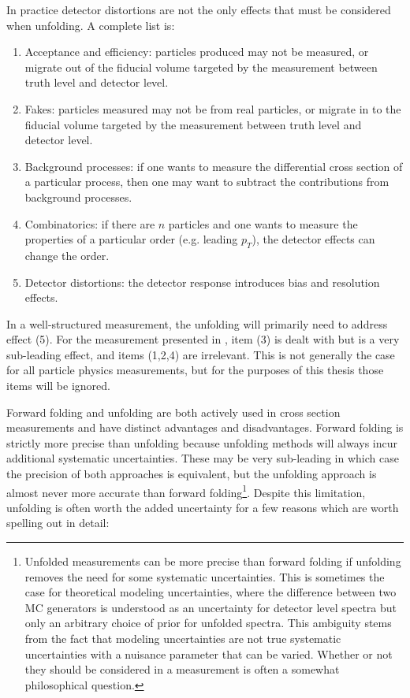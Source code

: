 In practice detector distortions are not the only effects that must be considered when unfolding.
A complete list is:
\begin{enumerate}[label={(\arabic*)}]
    \item Acceptance and efficiency: particles produced may not be measured, or migrate out of the fiducial volume targeted by the measurement between truth level and detector level.
    \item Fakes: particles measured may not be from real particles, or migrate in to the fiducial volume targeted by the measurement between truth level and detector level.
    \item Background processes: if one wants to measure the differential cross section of a particular process, then one may want to subtract the contributions from background processes.
    \item Combinatorics: if there are $n$ particles and one wants to measure the properties of a particular order (e.g. leading $p_T$), the detector effects can change the order.
    \item Detector distortions: the detector response introduces bias and resolution effects.
\end{enumerate}
In a well-structured measurement, the unfolding will primarily need to address effect (5).
For the measurement presented in , item (3) is dealt with but is a very sub-leading effect, and items (1,2,4) are irrelevant.
This is not generally the case for all particle physics measurements, but for the purposes of this thesis those items will be ignored.

Forward folding and unfolding are both actively used in cross section measurements and have distinct advantages and disadvantages.
Forward folding is strictly more precise than unfolding because unfolding methods will always incur additional systematic uncertainties.
These may be very sub-leading in which case the precision of both approaches is equivalent, but the unfolding approach is almost never more accurate than forward folding\footnote{Unfolded measurements can be more precise than forward folding if unfolding removes the need for some systematic uncertainties. This is sometimes the case for theoretical modeling uncertainties, where the difference between two MC generators is understood as an uncertainty for detector level spectra but only an arbitrary choice of prior for unfolded spectra. This ambiguity stems from the fact that modeling uncertainties are not true systematic uncertainties with a nuisance parameter that can be varied. Whether or not they should be considered in a measurement is often a somewhat philosophical question.}.
Despite this limitation, unfolding is often worth the added uncertainty for a few reasons which are worth spelling out in detail:

